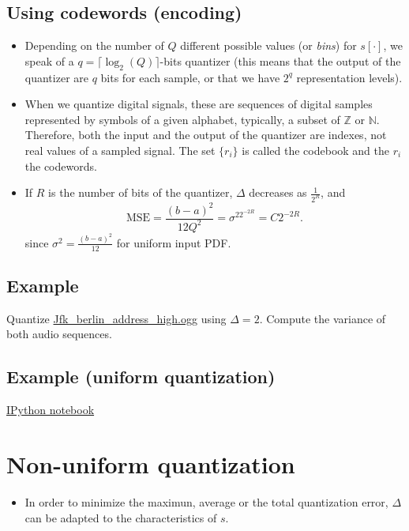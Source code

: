 \subsection{Using codewords (encoding)}
\begin{itemize}
  \tightlist
  
\item
  Depending on the number of \(Q\) different possible values (or
  \emph{bins}) for \(s[\cdot]\), we speak of a
  \(q=\lceil\log_2(Q)\rceil\)-bits quantizer (this means that the output
  of the quantizer are \(q\) bits for each sample, or that we have
  \(2^q\) representation levels).

\item
  When we quantize digital signals, these are sequences of digital
  samples represented by symbols of a given alphabet, typically, a
  subset of \({\mathbb{Z}}\) or \({\mathbb{N}}\). Therefore, both the
  input and the output of the quantizer are indexes, not real values
  of a sampled signal. The set $\{r_i\}$ is called the codebook and
  the $r_i$ the codewords.

\item If $R$ is the number of bits of the quantizer, $\Delta$
  decreases as $\frac{1}{2^R}$, and
  \begin{equation}
    \text{MSE} = \frac{(b-a)^2}{12Q^2} = \sigma^22^{-2R}=C2^{-2R}.
  \end{equation}
  since $\sigma^2=\frac{(b-a)^2}{12}$ for uniform input PDF. 
\end{itemize}

\subsection{Example}
Quantize
\href{https://upload.wikimedia.org/wikipedia/commons/3/3a/Jfk_berlin_address_high.ogg}{Jfk\_berlin\_address\_high.ogg}
using \(\Delta=2\). Compute the variance of both audio sequences.

\subsection*{Example (uniform quantization)}
\href{https://nbviewer.jupyter.org/github/vicente-gonzalez-ruiz/quantization/blob/master/uniform_quantization.ipynb}{IPython notebook}

\section{Non-uniform quantization}
\begin{itemize}
  \tightlist
\item
  In order to minimize the maximun, average or the total quantization
  error, \(\Delta\) can be adapted to the characteristics of \(s\).
\end{itemize}

